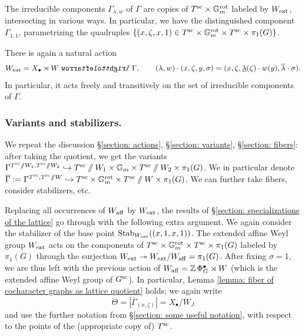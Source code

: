 The irreducible components $\Gamma_{\lambda, w}$ of $\Gamma$ are copies of $T^{\sc} \times \Gm^{\rot}$ labeled by $W_{\ext}$, intersecting in various ways. In particular, we have the distinguished component $\Gamma_{1, 1}$, parametrizing the quadruples $\{ (x, \zeta, x, 1) \in T^{\sc} \times \Gm^{\rot} \times T^{\sc} \times \pi_1(G)\}$.

There is again a natural action 
\begin{equation*}
W_{\ext} = X_{\bullet} \rtimes W \acts \Gamma, \qquad  (\lambda, w) \cdot (x, \zeta, y, \sigma) = (x, \zeta, \underline{\lambda}(\zeta) \cdot w(y), \overline{\lambda} \cdot \sigma ).   
\end{equation*}
In particular, it acts freely and transitively on the set of irreducible components of $\Gamma$. 



\subsubsection{Variants and stabilizers.}\label{subsubsection: variants and stabilizers for reductive G}
We repeat the discussion \S \ref{section: actions}, \S \ref{section: variants}, \S \ref{section: fibers}: after taking the quotient, we get the variants $\Gamma^{T^{\sc} \sslash W_1, T^{\sc} \sslash W_2} \hookrightarrow T^{\sc} \sslash W_1 \times \Gm \times T^{\sc} \sslash W_2 \times \pi_1(G)$. We in particular denote $\overline{\Gamma} := \Gamma^{T^{\sc}, T^{\sc} \sslash W} \hookrightarrow T^{\sc} \times \Gm^{\rot} \times T^{\sc} \sslash W \times \pi_1(G)$. We can further take fibers, consider stabilizers, etc.

Replacing all occurrences of $W_{\aff}$ by $W_{\ext}$, the results of \S \ref{section: specializations of the lattice} go through with the following extra argument. We again consider the stabilizer of the base point $\Stab_{W_{\ext}}((x, 1, x, 1))$. The extended affine Weyl group $W_{\ext}$ acts on the components of $T^{\sc} \times \Gm^{\rot} \times T^{\sc} \times \pi_1(G)$ labeled by $\pi_1(G)$ through the surjection $W_{\ext} \twoheadrightarrow W_{\ext} / W_{\aff} = \pi_1(G)$. After fixing $\sigma = 1$, we are thus left with the previous action of $W_{\aff} = \Z\Phi^{\bullet}_G \rtimes W$ (which is the extended affine Weyl group of $G^{\sc}$).
%
In particular, Lemma \ref{lemma: fiber of cocharacter graphs as lattice quotient} holds; we again write
\begin{equation*}
 \Theta = |\overline{\Gamma}_{(x, \zeta)}| = X_{\bullet} /  W_J
\end{equation*}
and use the further notation from \S \ref{section: some useful notation}, with respect to the points of the (appropriate copy of) $T^{\sc}$.




